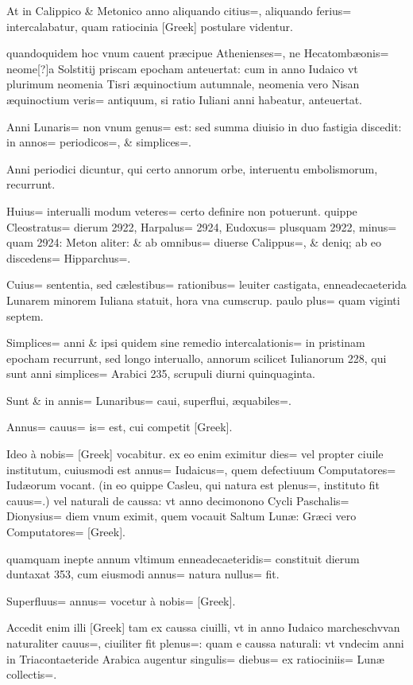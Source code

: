 \begin{parnumbers}

At in Calippico \& Metonico anno aliquando citius=, aliquando ferius=  intercalabatur, quam ratiocinia [Greek] postulare videntur.

quandoquidem hoc vnum cauent præcipue Athenienses=, ne Hecatombæonis= neome[?]a Solstitij priscam epocham anteuertat: cum in anno Iudaico vt plurimum neomenia Tisri æquinoctium autumnale, neomenia vero Nisan æquinoctium veris= antiquum, si ratio Iuliani anni habeatur, anteuertat.

Anni Lunaris= non vnum genus= est: sed summa diuisio in duo fastigia discedit: in annos= periodicos=, \& simplices=.

Anni periodici dicuntur, qui certo annorum orbe, interuentu embolismorum, recurrunt.

Huius= interualli modum veteres= certo definire non potuerunt. quippe Cleostratus= dierum 2922, Harpalus=  2924, Eudoxus= plusquam 2922, minus= quam 2924: Meton aliter: \& ab omnibus= diuerse Calippus=, \& deniq; ab eo discedens= Hipparchus=.

Cuius= sententia, sed cælestibus= rationibus= leuiter castigata, enneadecaeterida Lunarem minorem Iuliana statuit, hora vna cumscrup. paulo plus= quam viginti septem.

Simplices= anni \& ipsi quidem sine remedio intercalationis= in pristinam epocham recurrunt, sed longo interuallo, annorum scilicet Iulianorum 228, qui sunt anni simplices= Arabici 235, scrupuli diurni quinquaginta.

Sunt \& in annis= Lunaribus= caui, superflui, æquabiles=.

Annus= cauus= is= est, cui competit [Greek].

Ideo à nobis= [Greek] vocabitur. ex eo enim eximitur dies= vel propter ciuile institutum, cuiusmodi est annus= Iudaicus=, quem defectiuum  Computatores= Iudæorum vocant. (in eo quippe Casleu, qui natura est plenus=, instituto fit cauus=.) vel naturali de caussa: vt anno decimonono Cycli Paschalis= Dionysius= diem vnum eximit, quem vocauit Saltum Lunæ: Græci vero Computatores= [Greek].

quamquam inepte annum vltimum enneadecaeteridis= constituit dierum duntaxat 353, cum eiusmodi annus= natura nullus= fit.

Superfluus= annus= vocetur à nobis= [Greek].

Accedit enim illi [Greek] tam ex caussa ciuilli, vt in anno Iudaico marcheschvvan naturaliter cauus=, ciuiliter fit plenus=: quam e caussa naturali: vt vndecim anni in Triacontaeteride Arabica augentur singulis= diebus= ex ratiociniis= Lunæ collectis=.


\end{parnumbers}
